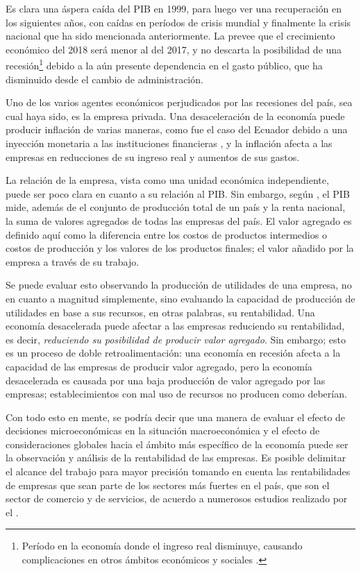 \documentclass[12pt,a4paper,twoside]{article}
\begin{document}
Es clara una áspera caída del PIB en 1999, para luego ver una recuperación en los siguientes años, con caídas en períodos de crisis mundial y finalmente la crisis nacional que ha sido mencionada anteriormente. La \textcite{ladesaceleracioncorporaciondeestudiosparaeldesarrollo} prevee que el crecimiento económico del 2018 será menor al del 2017, y no descarta la posibilidad de una recesión\footnote{Período en la economía donde el ingreso real disminuye, causando complicaciones en otros ámbitos económicos y sociales \parencite{principiosdemankiw}.} debido a la aún presente dependencia en el gasto público, que ha disminuido desde el cambio de administración.

Uno de los varios agentes económicos perjudicados por las recesiones del país, sea cual haya sido, es la empresa privada. Una desaceleración de la economía puede producir inflación de varias maneras, como fue el caso del Ecuador debido a una inyección monetaria a las instituciones financieras \parencite{memoriaanualbancocentraldelecuador}, y la inflación afecta a las empresas en reducciones de su ingreso real y aumentos de sus gastos.

La relación de la empresa, vista como una unidad económica independiente, puede ser poco clara en cuanto a su relación al PIB. Sin embargo, según \textcite{macroeconomicsmankiw}, el PIB mide, además de el conjunto de producción total de un país y la renta nacional, la suma de valores agregados de todas las empresas del país. El valor agregado es definido aquí como la diferencia entre los costos de productos intermedios o costos de producción y los valores de los productos finales; el valor añadido por la empresa a través de su trabajo. 

Se puede evaluar esto observando la producción de utilidades de una empresa, no en cuanto a magnitud simplemente, sino evaluando la capacidad de producción de utilidades en base a sus recursos, en otras palabras, su rentabilidad. Una economía desacelerada puede afectar a las empresas reduciendo su rentabilidad, es decir, \textit{reduciendo su posibilidad de producir valor agregado}. Sin embargo; esto es un proceso de doble retroalimentación: una economía en recesión afecta a la capacidad de las empresas de producir valor agregado, pero la economía desacelerada es causada por una baja producción de valor agregado por las empresas; establecimientos con mal uso de recursos no producen como deberían.

Con todo esto en mente, se podría decir que una manera de evaluar el efecto de decisiones microeconómicas en la situación macroeconómica y el efecto de consideraciones globales hacia el ámbito más específico de la economía puede ser la observación y análisis de la rentabilidad de las empresas. Es posible delimitar el alcance del trabajo para mayor precisión tomando en cuenta las rentabilidades de empresas que sean parte de los sectores más fuertes en el país, que son el sector de comercio y de servicios, de acuerdo a numerosos estudios realizado por el \textcite{directoriodeinstitutodeestadisticaycensos}.
\end{document}
